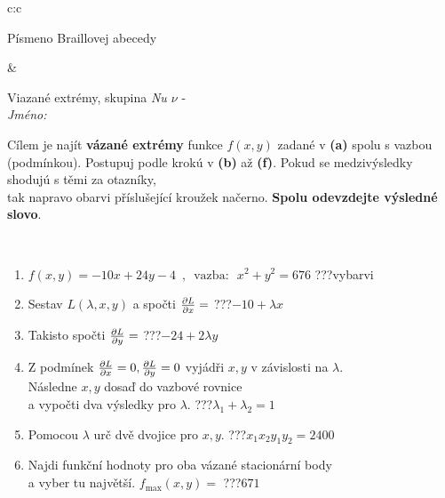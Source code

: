 \documentclass[10pt]{report}
\begin{document}
\begin{tabular}{c:c}
\begin{minipage}[c][104.5mm][t]{0.5\linewidth}
\begin{center}
\begin{minipage}{0.20\linewidth}
\begin{center}
{\small Písmeno Braillovej abecedy}
\end{center}
\end{minipage}
\end{center}
\end{minipage}
&
\begin{minipage}[c][104.5mm][t]{0.5\linewidth}
\begin{center}
\vspace{7mm}
{\huge Viazané extrémy, skupina \textit{Nu $\nu$} -}\\[5mm]
\textit{Jméno:}\phantom{xxxxxxxxxxxxxxxxxxxxxxxxxxxxxxxxxxxxxxxxxxxxxxxxxxxxxxxxxxxxxxxxx}\\[5mm]
\begin{minipage}{0.95\linewidth}
\begin{center}
Cílem je najít \textbf{vázané extrémy} funkce $f(x,y)$ zadané v \textbf{(a)} spolu s vazbou (podmínkou). Postupuj podle krokú v \textbf{(b)} až \textbf{(f)}. Pokud se medzivýsledky shodujú s těmi za otazníky,\\tak napravo obarvi příslušející kroužek načerno. \textbf{Spolu odevzdejte výsledné slovo}.
\end{center}
\end{minipage}
\\[1mm]
\begin{minipage}{0.79\linewidth}
\begin{center}
\begin{varwidth}{\linewidth}
\begin{enumerate}
\normalsize
\item $f(x,y)=-10x+24y-4 \enspace , \enspace \mathrm{vazba:} \enspace x^2+y^2=676$\quad \dotfill\; ???\;\dotfill \quad vybarvi
\item Sestav $L(\lambda,x,y)$ a spočti $\pdv{L}{x}=$\quad \dotfill\; ???\;\dotfill \quad $-10+\lambda x$
\item Takisto spočti $\pdv{L}{y}=$\quad \dotfill\; ???\;\dotfill \quad $-24+2\lambda y$
\item Z podmínek $\pdv{L}{x}=0 , \pdv{L}{y}=0$ vyjádři $x,y$ v závislosti na $\lambda$.\\ \phantom{xxxxxx}Následne $x,y$ dosaď do vazbové rovnice\\ \phantom{xxxxxx}a vypočti dva výsledky pro $\lambda$.\quad \dotfill\; ???\;\dotfill \quad $\lambda_1+\lambda_2=1$
\item Pomocou $\lambda$ urč dvě dvojice pro $x,y$.\quad \dotfill\; ???\;\dotfill \quad $x_1 x_2 y_1 y_2=2400$
\item Najdi funkční hodnoty pro oba vázané stacionární body\\ \phantom{xxxxxx}a vyber tu najvětší. $f_{\text{max}}(x,y)=$\quad \dotfill\; ???\;\dotfill \quad $671$

\end{enumerate}
\end{varwidth}
\end{center}
\end{minipage}
\end{center}
\end{minipage}
\end{tabular}
\end{document}
